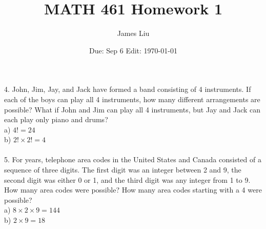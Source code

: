 \documentclass{article}
\date{Due: Sep 6  Edit: \today}
\title{MATH 461 Homework 1}
\author{James Liu}
\begin{document}
\maketitle

4. John, Jim, Jay, and Jack have formed a band consisting of 4 instruments. 
If each of the boys can play all 4
instruments, how many different arrangements are possible? 
What if John and Jim can play all 4 instruments, but
Jay and Jack can each play only piano and drums?
\\
a) \(4!=24\)\\
b) \(2!\times2!=4\)
\\ \\
5. For years, telephone area codes in the United States and
Canada consisted of a sequence of three digits. The first
digit was an integer between 2 and 9, the second digit was
either 0 or 1, and the third digit was any integer from 1 to
9. How many area codes were possible? How many area
codes starting with a 4 were possible?\\
a) \(8\times2\times9=144\)\\
b) \(2\times9=18\)
\end{document}
